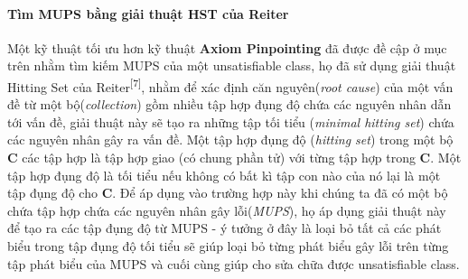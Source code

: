 \paragraph{Tìm MUPS bằng giải thuật HST của Reiter}
Một kỹ thuật tối ưu hơn kỹ thuật \textbf{Axiom Pinpointing} đã được đề cập ở mục trên nhằm tìm kiếm MUPS của một unsatisfiable class, họ đã sử dụng giải thuật Hitting Set của Reiter\textsuperscript{[7]}, nhằm để xác định căn nguyên(\textit{root cause}) của một vấn đề từ một bộ(\textit{collection}) gồm nhiều tập hợp đụng độ chứa các nguyên nhân dẫn tới vấn đề, giải thuật này sẽ tạo ra những tập tối tiểu (\textit{minimal hitting set}) chứa các nguyên nhân gây ra vấn đề. Một tập hợp đụng độ (\textit{hitting set}) trong một bộ \textbf{C} các tập hợp là tập hợp giao (có chung phần tử) với từng tập hợp trong \textbf{C}. Một tập hợp đụng độ là tối tiểu nếu không có bất kì tập con nào của nó lại là một tập đụng độ cho \textbf{C}. Để áp dụng vào trường hợp này khi chúng ta đã có một bộ chứa tập hợp chứa các nguyên nhân gây lỗi(\textit{MUPS}), họ áp dụng giải thuật này để tạo ra các tập đụng độ từ MUPS - ý tưởng ở đây là loại bỏ tất cả các phát biểu trong tập đụng độ tối tiểu sẽ giúp loại bỏ từng phát biểu gây lỗi trên từng tập phát biểu của MUPS và cuối cùng giúp cho sửa chữa được unsatisfiable class.		

